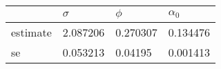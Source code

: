\begin{tabular}{llll}
\toprule
{} &  $\sigma$ &    $\phi$ & $\alpha_0$ \\
\midrule
estimate &  2.087206 &  0.270307 &   0.134476 \\
se       &  0.053213 &   0.04195 &   0.001413 \\
\bottomrule
\end{tabular}
